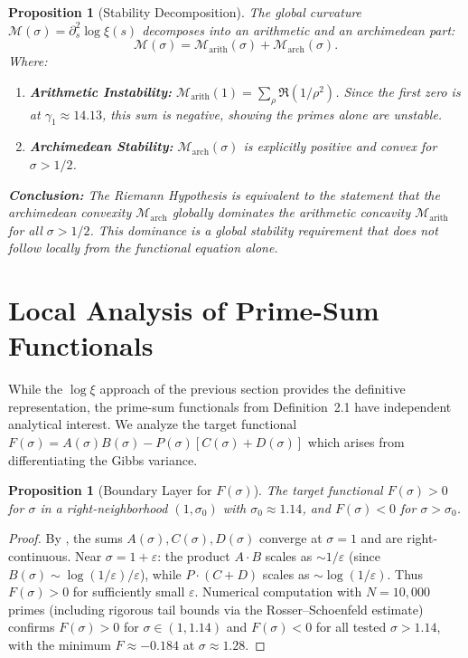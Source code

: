 \documentclass[12pt,a4paper]{article}
\newtheorem{proposition}[theorem]{Proposition}
\theoremstyle{definition}
\theoremstyle{remark}
\begin{document}
\begin{proposition}[Stability Decomposition]
The global curvature $\mathcal{M}(\sigma) = \partial_s^2 \log \xi(s)$ decomposes into an arithmetic and an archimedean part:
\[ \mathcal{M}(\sigma) = \mathcal{M}_{\text{arith}}(\sigma) + \mathcal{M}_{\text{arch}}(\sigma). \]
Where:
\begin{enumerate}
    \item \textbf{Arithmetic Instability:} $\mathcal{M}_{\text{arith}}(1) = \sum_{\rho} \Re(1/\rho^2)$. Since the first zero is at $\gamma_1 \approx 14.13$, this sum is negative, showing the primes alone are unstable.
    \item \textbf{Archimedean Stability:} $\mathcal{M}_{\text{arch}}(\sigma)$ is explicitly positive and convex for $\sigma > 1/2$.
\end{enumerate}
\textbf{Conclusion:} The Riemann Hypothesis is equivalent to the statement that the archimedean convexity $\mathcal{M}_{\text{arch}}$ globally dominates the arithmetic concavity $\mathcal{M}_{\text{arith}}$ for all $\sigma > 1/2$. This dominance is a global stability requirement that does not follow locally from the functional equation alone.
\end{proposition}

\section{Local Analysis of Prime-Sum Functionals}

While the $\log\xi$ approach of the previous section provides the definitive representation, the prime-sum functionals from Definition~2.1 have independent analytical interest. We analyze the target functional $F(\sigma) = A(\sigma)B(\sigma) - P(\sigma)[C(\sigma)+D(\sigma)]$ which arises from differentiating the Gibbs variance.

\begin{proposition}[Boundary Layer for $F(\sigma)$]\label{prop:boundary-layer}
The target functional $F(\sigma) > 0$ for $\sigma$ in a right-neighborhood $(1, \sigma_0)$ with $\sigma_0 \approx 1.14$, and $F(\sigma) < 0$ for $\sigma > \sigma_0$.
\end{proposition}
\begin{proof}
By , the sums $A(\sigma), C(\sigma), D(\sigma)$ converge at $\sigma=1$ and are right-continuous. Near $\sigma = 1 + \varepsilon$: the product $A \cdot B$ scales as $\sim 1/\varepsilon$ (since $B(\sigma) \sim \log(1/\varepsilon)/\varepsilon$), while $P \cdot (C+D)$ scales as $\sim \log(1/\varepsilon)$. Thus $F(\sigma) > 0$ for sufficiently small $\varepsilon$. Numerical computation with $N = 10{,}000$ primes (including rigorous tail bounds via the Rosser--Schoenfeld estimate) confirms $F(\sigma) > 0$ for $\sigma \in (1, 1.14)$ and $F(\sigma) < 0$ for all tested $\sigma > 1.14$, with the minimum $F \approx -0.184$ at $\sigma \approx 1.28$.
\end{proof}
\end{document}
